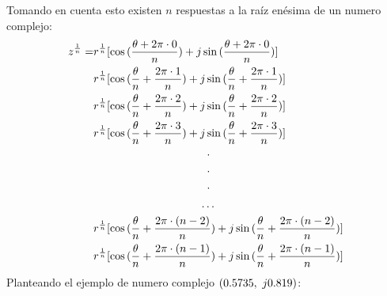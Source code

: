     Tomando en cuenta esto existen $n$ respuestas a la raíz enésima de un numero complejo:
    \begin{equation}
    \begin{aligned}
         z^{\frac{1}{n}}= & r^{\frac{1}{n}}[\cos{(\frac{\theta + 2\pi \cdot 0}{n})}+j\sin{(\frac{\theta + 2\pi \cdot 0}{n})}]\\
                        & r^{\frac{1}{n}}[\cos{(\frac{\theta}{n} +\frac{2\pi \cdot 1}{n})}+j\sin{(\frac{\theta}{n} +\frac{2\pi \cdot 1}{n})}]\\
                        & r^{\frac{1}{n}}[\cos{(\frac{\theta}{n} +\frac{2\pi \cdot 2}{n})}+j\sin{(\frac{\theta}{n} +\frac{2\pi \cdot 2}{n})}]\\
                        & r^{\frac{1}{n}}[\cos{(\frac{\theta}{n} +\frac{2\pi \cdot 3}{n})}+j\sin{(\frac{\theta}{n} +\frac{2\pi \cdot 3}{n})}]\\
                        &\hspace{3.6cm} \cdot \\
                        &\hspace{3.6cm} \cdot \\
                        &\hspace{3.6cm} \cdot \\
                        &\hspace{3.37cm} \ldots \\
                        & r^{\frac{1}{n}}[\cos{(\frac{\theta}{n} +\frac{2\pi \cdot (n-2)}{n})}+j\sin{(\frac{\theta}{n} +\frac{2\pi \cdot (n-2)}{n})}]\\
                        & r^{\frac{1}{n}}[\cos{(\frac{\theta}{n} +\frac{2\pi \cdot (n-1)}{n})}+j\sin{(\frac{\theta}{n} +\frac{2\pi \cdot (n-1)}{n})}]\\
    \end{aligned}
    \end{equation}
    Planteando el ejemplo de numero complejo $(\-0.5735,\ j0.819)$:
